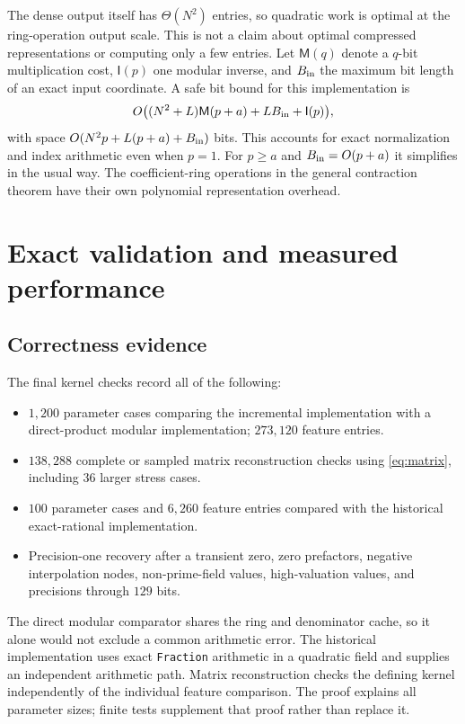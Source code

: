 \documentclass[11pt,letterpaper]{article}
\theoremstyle{definition}\newtheorem{definition}[theorem]{Definition}
\theoremstyle{remark}\newtheorem{remark}[theorem]{Remark}
\begin{document}
The dense output itself has $\Theta(N^2)$ entries, so quadratic work is
optimal at the ring-operation output scale. This is not a claim about
optimal compressed representations or computing only a few entries.
Let $\mathsf M(q)$ denote a $q$-bit multiplication cost, $\mathsf I(p)$
one modular inverse, and $B_{\rm in}$ the maximum bit length of an exact
input coordinate. A safe bit bound for this implementation is
\[
 O\bigl((N^2+L)\mathsf M(p+a)+LB_{\rm in}+\mathsf I(p)\bigr),
\]
with space $O(N^2p+L(p+a)+B_{\rm in})$ bits. This accounts for exact
normalization and index arithmetic even when $p=1$. For $p\ge a$ and
$B_{\rm in}=O(p+a)$ it simplifies in the usual way. The coefficient-ring
operations in the general contraction theorem have their own polynomial
representation overhead.

\section{Exact validation and measured performance}
\label{sec:evidence}

\subsection{Correctness evidence}

The final kernel checks record all of the following:
\begin{itemize}
\item $1{,}200$ parameter cases comparing the incremental implementation
with a direct-product modular implementation; $273{,}120$ feature entries.
\item $138{,}288$ complete or sampled matrix reconstruction checks using
\eqref{eq:matrix}, including $36$ larger stress cases.
\item $100$ parameter cases and $6{,}260$ feature entries compared with
the historical exact-rational  implementation.
\item Precision-one recovery after a transient zero, zero prefactors,
negative interpolation nodes, non-prime-field values, high-valuation
values, and precisions through $129$ bits.
\end{itemize}

The direct modular comparator shares the ring and denominator cache, so
it alone would not exclude a common arithmetic error. The historical
implementation uses exact \texttt{Fraction} arithmetic in a quadratic
field and supplies an independent arithmetic path. Matrix reconstruction
checks the defining kernel independently of the individual feature
comparison. The proof explains all parameter sizes; finite tests supplement
that proof rather than replace it.
\end{document}
